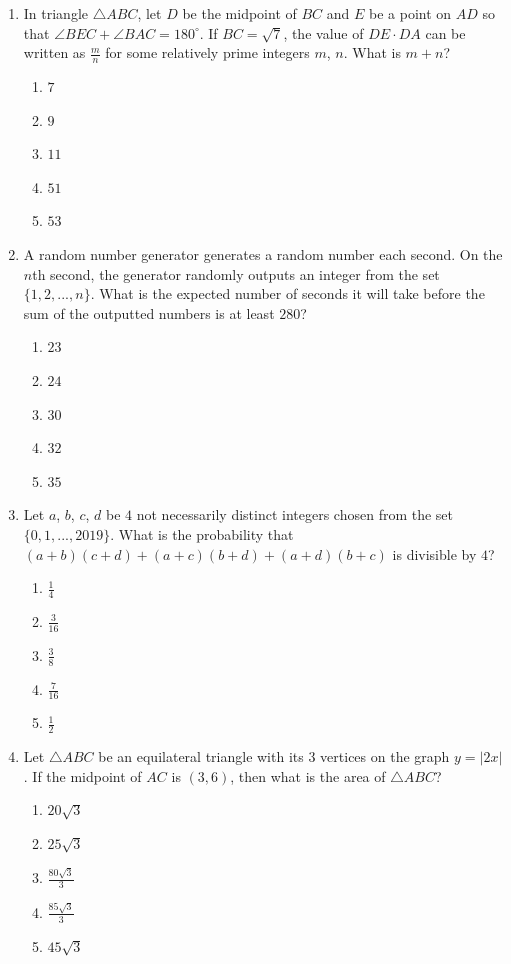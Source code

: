 \documentclass{article}
\begin{document}
\begin{enumerate}
\item In triangle $\triangle ABC$, let $D$ be the midpoint of $BC$ and $E$ be a point on $AD$ so that $\angle BEC+\angle BAC=180^{\circ}$. If $BC=\sqrt{7}$, the value of $DE \cdot DA$ can be written as $\frac{m}{n}$ for some relatively prime integers $m$, $n$. What is $m+n$?
\begin{enumerate}
    \item $7$
    \item $9$
    \item $11$
    \item $51$
    \item $53$
\end{enumerate}

\item A random number generator generates a random number each second. On the $n$th second, the generator randomly outputs an integer from the set $\{1,2,..., n\}$. What is the expected number of seconds it will take before the sum of the outputted numbers is at least $280$?
\begin{enumerate}
    \item $23$
    \item $24$
    \item $30$
    \item $32$
    \item $35$
\end{enumerate}

\item Let $a$, $b$, $c$, $d$ be $4$ not necessarily distinct integers chosen from the set $\{0,1,..., 2019\}$. What is the probability that $(a+b)(c+d)+(a+c)(b+d)+(a+d)(b+c)$ is divisible by $4$?
\begin{enumerate}
    \item $\frac{1}{4}$
    \item $\frac{3}{16}$
    \item $\frac{3}{8}$
    \item $\frac{7}{16}$
    \item $\frac{1}{2}$
\end{enumerate}

\item Let $\triangle ABC$ be an equilateral triangle with its $3$ vertices on the graph $y=|2x|$. If the midpoint of $AC$ is $(3,6)$, then what is the area of $\triangle ABC$?
\begin{enumerate}
    \item $20\sqrt{3}$
    \item $25\sqrt{3}$
    \item $\frac{80\sqrt{3}}{3}$
    \item $\frac{85\sqrt{3}}{3}$
    \item $45\sqrt{3}$
\end{enumerate}


\end{enumerate}
\end{document}

